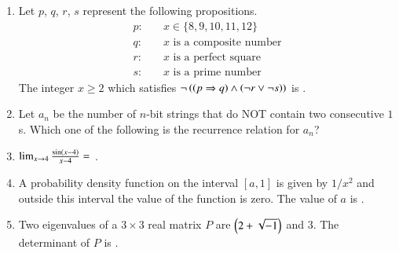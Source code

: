 \documentclass[journal,12pt,onecolumn]{IEEEtran}
\theoremstyle{remark}
\begin{document}
	\begin{enumerate}


		
		\item Let $p$, $q$, $r$, $s$ represent the following propositions.
		\begin{align*}
			p\colon & \quad x \in \{8, 9, 10, 11, 12\} \\
			q\colon & \quad x \text{ is a composite number} \\
			r\colon & \quad x \text{ is a perfect square} \\
			s\colon & \quad x \text{ is a prime number}
		\end{align*}
		The integer $x \geq 2$ which satisfies $\neg\left(\left(p \Rightarrow q\right) \land \left(\neg r \lor \neg s\right)\right)$ is \underline{\hspace{2cm}}.
		
		\hfill{}
		
		\item Let $a_n$ be the number of $n$-bit strings that do NOT contain two consecutive $1$s. Which one of the following is the recurrence relation for $a_n$?
		
		\hfill{}
		\begin{enumerate}
		\end{enumerate}
		
		\item $\lim_{x \to 4} \frac{\sin\left(x - 4\right)}{x - 4} = $ \underline{\hspace{2cm}}.
		
		\hfill{}
		
		\item A probability density function on the interval $[a, 1]$ is given by $1/x^2$ and outside this interval the value of the function is zero. The value of $a$ is \underline{\hspace{2cm}}.
		
		\hfill{}
		
		\item Two eigenvalues of a $3 \times 3$ real matrix $P$ are $\left(2 + \sqrt{-1}\right)$ and $3$. The determinant of $P$ is \underline{\hspace{2cm}}.
		

\end{enumerate}
\end{document}
